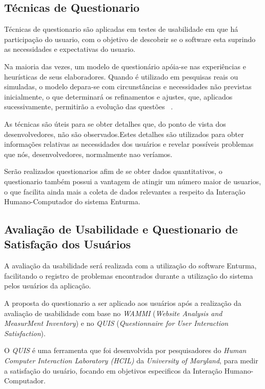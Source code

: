 \subsection{Técnicas de Questionario}
	Técnicas de questionario são aplicadas em testes de usabilidade em que há participação do usuario, com o objetivo de descobrir se o software esta suprindo as necessidades e expectativas do usuario.

	Na maioria das vezes, um modelo de questionário apóia-se nas experiências e
	heurísticas de seus elaboradores. Quando é utilizado em pesquisas reais ou simuladas, o
	modelo depara-se com circunstâncias e necessidades não previstas inicialmente, o que
	determinará os refinamentos e ajustes, que, aplicados sucessivamente, permitirão a
	evolução das questões ~\cite{usabilidade_web}. 
	
	As técnicas são úteis para se obter detalhes que, do ponto de vista dos desenvolvedores, não são observados.Estes detalhes são utilizados para obter informações relativas as necessidades dos usuários e revelar possíveis problemas que nós, desenvolvedores, normalmente nao veríamos.
	
	Serão realizados questionarios afim de se obter dados quantitativos, o questionario também possui a vantagem de atingir um número maior de usuarios, o que facilita ainda mais a coleta de dados relevantes a respeito da Interação Humano-Computador do sistema Enturma.
	
	


\subsection{Avaliação de Usabilidade e Questionario de Satisfação dos Usuários}

	A avaliação da usabilidade será realizada com a utilização do software Enturma, facilitando o registro de problemas encontrados durante a utilização do sistema pelos usuários da aplicação.
	
	A proposta do questionario a ser aplicado aos usuários após a realização da avaliação de usabilidade com base no \textit{WAMMI} (\textit{Website Analysis and MeasurMent Inventory}) e no \textit{QUIS} (\textit{Questionnaire for User Interaction Satisfaction}).


	O \textit{QUIS} é uma ferramenta que foi desenvolvida por pesquisadores do \textit{Human Computer Interaction Laboratory (HCIL)} da \textit{University of Maryland}, para medir a satisfação do usuário, focando em objetivos especificos da Interação Humano-Computador.
	
